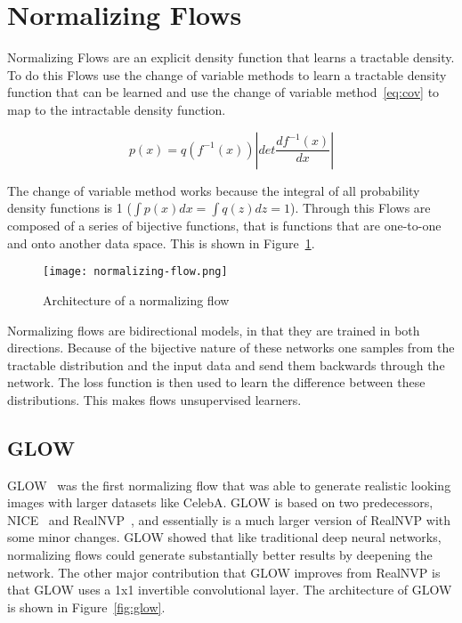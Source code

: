 \section{Normalizing Flows}\label{sec:nf}
Normalizing Flows are an explicit density function that learns a tractable
density. To do this Flows use the change of variable methods to learn a
tractable density function that can be learned and use the change of variable
method~\ref{eq:cov} to map to the intractable density function. 

\begin{equation}
p(x) = q(f^{-1}(x))|det\frac{df^{-1}(x)}{dx}|
\label{eq:cov}
\end{equation}

The change of variable method works because the integral of all probability
density functions is 1 ($\int p(x)dx = \int q(z)dz = 1$). Through this
Flows are composed of a series of bijective functions, that is functions that
are one-to-one and onto another data space. This is shown in
Figure~\ref{fig:nf}.

\begin{figure}[ht]
\centering
\texttt{[image: normalizing-flow.png]}
\caption{Architecture of a normalizing flow}
\label{fig:nf}
\end{figure}

Normalizing flows are bidirectional models, in that they are trained in both
directions. Because of the bijective nature of these networks one samples from
the tractable distribution and the input data and send them backwards through
the network. The loss function is then used to learn the difference between
these distributions. This makes flows unsupervised learners. 

\subsection{GLOW}
GLOW~\cite{GLOW} was the first normalizing flow that was able to generate realistic looking
images with larger datasets like CelebA. GLOW is based on two predecessors,
NICE~\cite{NICE} and RealNVP~\cite{RealNVP}, and essentially is a much larger version of
RealNVP with some minor changes. GLOW showed that like traditional deep neural
networks, normalizing flows could generate substantially better results by
deepening the network. The other major contribution that GLOW improves from
RealNVP is that GLOW uses a 1x1 invertible convolutional layer. The architecture
of GLOW is shown in Figure~\ref{fig:glow}.

